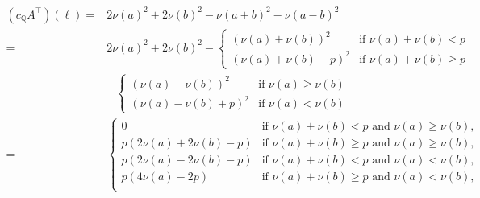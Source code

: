 \documentclass[12pt, a4paper]{article}
\theoremstyle{definition}
\newcommand{\QQ}{\mathbb Q}
\begin{document}
\begin{align*}
 (c_\QQ A^\top)(\ell)
 =& 2 \nu(a)^2 + 2 \nu(b)^2 - \nu(a+b)^2 - \nu(a-b)^2 \\
 =& 2 \nu(a)^2 + 2\nu(b)^2 
  - \begin{cases}
   (\nu(a) + \nu(b))^2 & \text{if } \nu(a) + \nu(b) < p \\
   (\nu(a) + \nu(b) - p)^2 & \text{if } \nu(a) + \nu(b) \geq p
  \end{cases} \\
  &- \begin{cases}
   (\nu(a) - \nu(b))^2 & \text{if } \nu(a) \geq \nu(b) \\
   (\nu(a) - \nu(b) + p)^2 & \text{if } \nu(a) < \nu(b)
  \end{cases} \\
  =& \begin{cases}
   0 & \text{if $\nu(a) + \nu(b) < p$ and $\nu(a) \geq \nu(b)$}, \\
   p( 2\nu(a) + 2\nu(b) - p) & \text{if $\nu(a) + \nu(b) \geq p$ and $\nu(a) \geq \nu(b)$}, \\
   p(2\nu(a) - 2\nu(b) - p) & \text{if $\nu(a) + \nu(b) < p$ and $\nu(a) < \nu(b)$}, \\
   p(4\nu(a)-2p) & \text{if $\nu(a) + \nu(b) \geq p$ and $\nu(a) < \nu(b)$}, \\
  \end{cases}
\end{align*}
\end{document}
